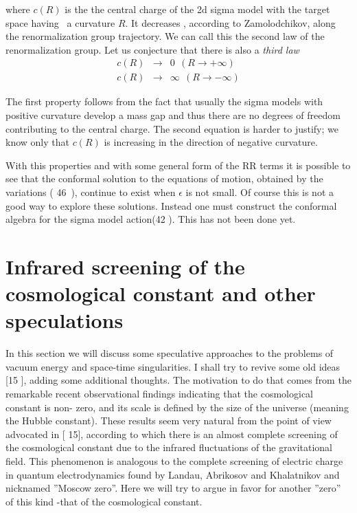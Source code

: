 \documentclass[a4paper,12pt]{article}
\begin{document}
where $c(R)$ is the the central charge of the 2d sigma model with the target
space having \ a curvature $R$. It decreases , according to Zamolodchikov,
along the renormalization group trajectory. We can call this the second law
of the renormalization group. Let us conjecture that there is also a \emph{%
third law} 
\begin{eqnarray}
c\left( R\right) &\rightarrow &0\ \ (R\rightarrow +\infty ) \\
c\left( R\right) &\rightarrow &\infty \ \ (R\rightarrow -\infty )
\end{eqnarray}

The first property follows from the fact that usually the sigma models with
positive curvature develop a mass gap and thus there are no degrees of
freedom contributing to the central charge. The second equation is harder to
justify; we know only that $c(R)$ is increasing in the direction of negative
curvature.

With this properties and with some general form of the RR terms it is
possible to see that the conformal solution to the equations of motion,
obtained by the variations ( 46\ ), continue to exist when $\epsilon $ is
not small. Of course this is not a good way to explore these solutions.
Instead one must construct the conformal algebra for the sigma model
action(42 ). This has not been done yet.

\section{Infrared screening of the cosmological constant and other
speculations}

In this section we will discuss some speculative approaches to the problems
of vacuum energy and space-time singularities. I shall try to revive some
old ideas [15 ], adding some additional thoughts. The motivation to do that
comes from the remarkable recent observational findings indicating that the
cosmological constant is non- zero, and its scale is defined by the size of
the universe (meaning the Hubble constant). These results seem very natural
from the point of view advocated in [ 15], according to which there is an
almost complete screening of the cosmological constant due to the infrared
fluctuations of the gravitational field. This phenomenon is analogous to the
complete screening of electric charge in quantum electrodynamics found by
Landau, Abrikosov and Khalatnikov and nicknamed ''Moscow zero''. Here we
will try to argue in favor for another ''zero'' of this kind -that of the
cosmological constant.
\end{document}
